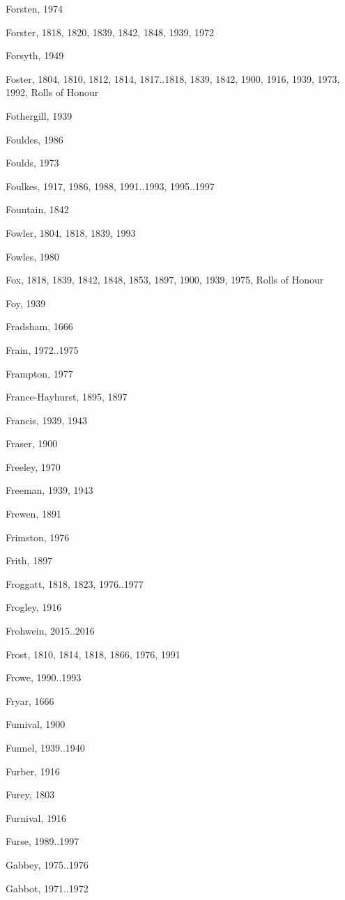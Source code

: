 \begin{theindex}
\item Forsten, 1974
\item Forster, 1818, 1820, 1839, 1842, 1848, 1939, 1972
\item Forsyth, 1949
\item Foster, 1804, 1810, 1812, 1814, 1817..1818, 1839, 1842, 1900, 1916, 1939, 1973, 1992, Rolls of Honour
\item Fothergill, 1939
\item Fouldes, 1986
\item Foulds, 1973
\item Foulkes, 1917, 1986, 1988, 1991..1993, 1995..1997
\item Fountain, 1842
\item Fowler, 1804, 1818, 1839, 1993
\item Fowles, 1980
\item Fox, 1818, 1839, 1842, 1848, 1853, 1897, 1900, 1939, 1975, Rolls of Honour
\item Foy, 1939
\item Fradsham, 1666
\item Frain, 1972..1975
\item Frampton, 1977
\item France-Hayhurst, 1895, 1897
\item Francis, 1939, 1943
\item Fraser, 1900
\item Freeley, 1970
\item Freeman, 1939, 1943
\item Frewen, 1891
\item Frimston, 1976
\item Frith, 1897
\item Froggatt, 1818, 1823, 1976..1977
\item Frogley, 1916
\item Frohwein, 2015..2016
\item Frost, 1810, 1814, 1818, 1866, 1976, 1991
\item Frowe, 1990..1993
\item Fryar, 1666
\item Fumival, 1900
\item Funnel, 1939..1940
\item Furber, 1916
\item Furey, 1803
\item Furnival, 1916
\item Furse, 1989..1997
\item Gabbey, 1975..1976
\item Gabbot, 1971..1972

\end{theindex}
